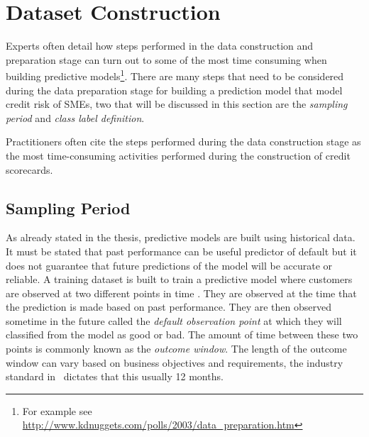 \section{Dataset Construction}\label{sec:datasetConstruction}

Experts often detail how steps performed in the data construction and preparation stage can turn out to some of the most time consuming  when building predictive models\footnote{For example see \url{http://www.kdnuggets.com/polls/2003/data_preparation.htm}}. There are many steps that need to be considered during the data preparation stage for building a prediction model that model credit risk of SMEs, two that will be discussed in this section are the \textit{sampling period} and \textit{class label definition}. 

Practitioners often cite the steps performed during the data construction stage as the most time-consuming
activities performed during the construction of credit scorecards.

\subsection{Sampling Period}
As already stated in the thesis, predictive models are built using historical data. It must be stated that past performance can be useful predictor of default but it does not guarantee that future predictions of the model will be accurate or reliable. A training dataset is built to train a predictive model where customers are observed at two different points in time \citep{martens_credit_2010}. They are observed at the time that the prediction is made based on past performance. They are then observed sometime in the future called the \textit{default observation point} at which they will classified from the model as good or bad. The amount of time between these two points is commonly known as the \textit{outcome window}. The length of the outcome window can vary based on business objectives and requirements, the industry standard in \subjectname\ dictates that this usually 12 months. 

